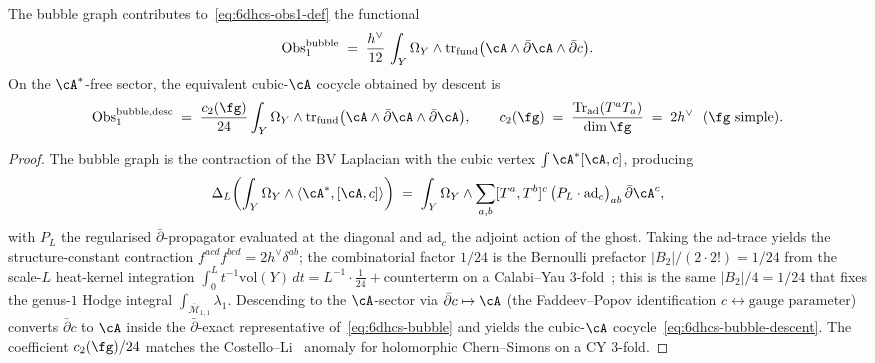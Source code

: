 \begin{proposition}
\label{prop:6dhcs-bubble-cocycle}
The bubble graph contributes to~\eqref{eq:6dhcs-obs1-def} the
functional
\begin{equation}\label{eq:6dhcs-bubble}
 \mathrm{Obs}_1^{\mathrm{bubble}}
 \;=\;
 \frac{h^\vee}{12}\,
 \int_Y\Omega_Y\wedge
 \mathrm{tr}_{\mathrm{fund}}\bigl(\cA\wedge\bar\partial\cA
 \wedge\bar\partial c\bigr).
\end{equation}
On the $\cA^*$-free sector, the equivalent cubic-$\cA$ cocycle
obtained by descent is
\begin{equation}\label{eq:6dhcs-bubble-descent}
 \mathrm{Obs}_1^{\mathrm{bubble,desc}}
 \;=\;
 \frac{c_2(\fg)}{24}
 \int_Y\Omega_Y\wedge
 \mathrm{tr}_{\mathrm{fund}}\bigl(\cA\wedge\bar\partial\cA
 \wedge\bar\partial\cA\bigr),
 \qquad
 c_2(\fg)\;=\;\frac{\mathrm{Tr}_{\mathrm{ad}}(T^aT_a)}{\dim\fg}
 \;=\; 2h^\vee\ \ (\fg\text{ simple}).
\end{equation}
\end{proposition}

\begin{proof}
The bubble graph is the contraction of the BV Laplacian with the
cubic vertex $\int\cA^*[\cA,c]$, producing
\[
 \Delta_L\!\left(\int_Y\Omega_Y\wedge\langle\cA^*,[\cA,c]\rangle\right)
 \;=\;
 \int_Y\Omega_Y\wedge
 \sum_{a,b}[T^a,T^b]^c\,
 \bigl(P_L\cdot\mathrm{ad}_c\bigr)_{ab}\,
 \bar\partial\cA^c,
\]
with $P_L$ the regularised $\bar\partial$-propagator evaluated at
the diagonal and $\mathrm{ad}_c$ the adjoint action of the ghost.
Taking the ad-trace yields the structure-constant contraction
$f^{acd}f^{bcd}=2h^\vee\delta^{ab}$; the combinatorial factor $1/24$
is the Bernoulli prefactor $|B_2|/(2\cdot 2!)=1/24$ from the scale-$L$
heat-kernel integration
$\int_0^L t^{-1}\mathrm{vol}(Y)\,dt=L^{-1}\cdot\tfrac{1}{24}
+\text{counterterm}$ on a Calabi--Yau 3-fold~\cite[Ch.\,5
Thm.\,5.4]{costello-renormalization}; this is the same
$|B_2|/4 = 1/24$ that fixes the genus-$1$ Hodge integral
$\int_{\overline{\mathcal{M}}_{1,1}}\lambda_1$. Descending to the
$\cA$-sector via $\bar\partial c\mapsto\cA$ (the Faddeev--Popov
identification $c\leftrightarrow\text{gauge parameter}$) converts
$\bar\partial c$ to $\cA$ inside the $\bar\partial$-exact
representative of~\eqref{eq:6dhcs-bubble} and yields the cubic-$\cA$
cocycle~\eqref{eq:6dhcs-bubble-descent}. The coefficient
$c_2(\fg)/24$ matches the
Costello--Li~\cite[eq.\,(6.12)]{CL16} anomaly for
holomorphic Chern--Simons on a CY 3-fold.
\end{proof}

